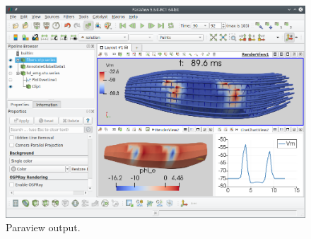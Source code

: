 \begin{figure}%
  \centering%
  \includegraphics[width=\textwidth]{images/implementation/paraview.png}%
  \caption{Paraview output.}%
  \label{fig:paraview_output}%
\end{figure}%

